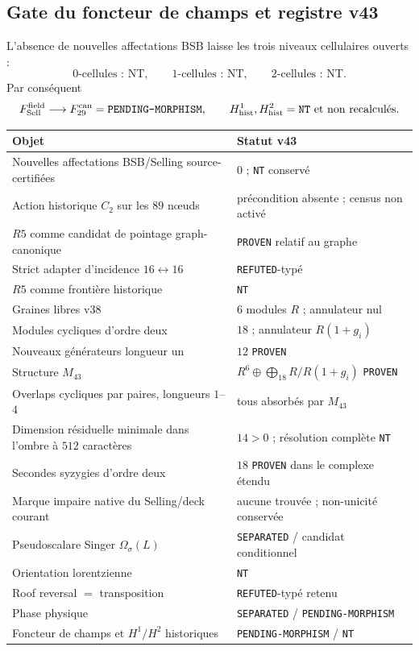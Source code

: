 \documentclass[11pt,a4paper]{article}
\newcommand{\certProven}{\texttt{PROVEN}}
\newcommand{\certRefuted}{\texttt{REFUTED}}
\newcommand{\certSeparated}{\texttt{SEPARATED}}
\newcommand{\certPending}{\texttt{PENDING-MORPHISM}}
\newcommand{\certNT}{\texttt{NT}}
\begin{document}
\subsection{Gate du foncteur de champs et registre v43}

L'absence de nouvelles affectations BSB laisse les trois niveaux cellulaires ouverts :
\[
 \text{$0$-cellules : NT},\qquad
 \text{$1$-cellules : NT},\qquad
 \text{$2$-cellules : NT}.
\]
Par conséquent
\[
 F_{\rm Sell}^{\rm field}\longrightarrow F_{29}^{\rm can}
 =\certPending,
 \qquad
 H^1_{\rm hist},H^2_{\rm hist}=\certNT\text{ et non recalculés}.
\]

\begin{center}
\begin{tabularx}{\textwidth}{@{}Xl@{}}
\toprule
Objet & Statut v43\\
\midrule
Nouvelles affectations BSB/Selling source-certifiées & $0$ ; \certNT{} conservé\\
Action historique $C_2$ sur les $89$ nœuds & précondition absente ; census non activé\\
$R5$ comme candidat de pointage graph-canonique & \certProven{} relatif au graphe\\
Strict adapter d'incidence $16\leftrightarrow16$ & \certRefuted{}-typé\\
$R5$ comme frontière historique & \certNT\\
Graines libres v38 & $6$ modules $R$ ; annulateur nul\\
Modules cycliques d'ordre deux & $18$ ; annulateur $R(1+g_i)$\\
Nouveaux générateurs longueur un & $12$ \certProven\\
Structure $M_{43}$ & $R^6\oplus\bigoplus_{18}R/R(1+g_i)$ \certProven\\
Overlaps cycliques par paires, longueurs $1$--$4$ & tous absorbés par $M_{43}$\\
Dimension résiduelle minimale dans l'ombre à $512$ caractères & $14>0$ ; résolution complète \certNT\\
Secondes syzygies d'ordre deux & $18$ \certProven{} dans le complexe étendu\\
Marque impaire native du Selling/deck courant & aucune trouvée ; non-unicité conservée\\
Pseudoscalare Singer $\Omega_\sigma(L)$ & \certSeparated{} / candidat conditionnel\\
Orientation lorentzienne & \certNT\\
Roof reversal $=$ transposition & \certRefuted{}-typé retenu\\
Phase physique & \certSeparated{} / \certPending\\
Foncteur de champs et $H^1/H^2$ historiques & \certPending{} / \certNT\\
\bottomrule
\end{tabularx}
\end{center}
\end{document}
